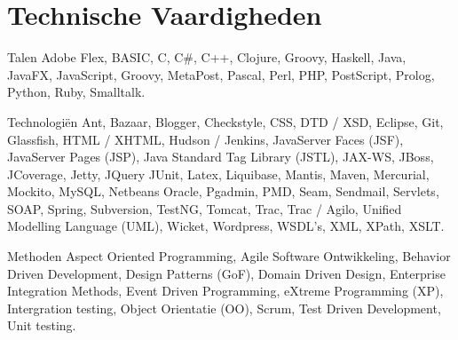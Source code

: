 \section*{Technische Vaardigheden}

	\begin{skillList}
		\item[Talen] Adobe Flex, BASIC, C, C\#, C++, Clojure, Groovy, Haskell, 
		Java, JavaFX, JavaScript, Groovy, MetaPost, Pascal, Perl, PHP, PostScript, 
		Prolog, Python, Ruby, Smalltalk.\hfill\\
		
		\item[Technologi\"en] Ant, Bazaar, Blogger, Checkstyle, CSS, DTD / XSD, 
		Eclipse, Git, Glassfish, HTML / XHTML, Hudson / Jenkins, 
		JavaServer Faces (JSF), JavaServer Pages (JSP), 
		Java Standard Tag Library (JSTL), JAX-WS, JBoss, JCoverage, Jetty, JQuery
		JUnit, Latex, Liquibase, Mantis, Maven, Mercurial, Mockito, MySQL, Netbeans
		Oracle, Pgadmin, PMD, Seam, Sendmail, Servlets, SOAP, Spring, Subversion,
		TestNG, Tomcat, Trac, Trac / Agilo, Unified Modelling Language (UML),
		Wicket, Wordpress, WSDL's, XML, XPath, XSLT.\hfill\\
		
		\item[Methoden] Aspect Oriented Programming, Agile Software Ontwikkeling,
		Behavior Driven Development, Design Patterns (GoF), Domain Driven Design, 
		Enterprise Integration Methods, Event Driven Programming, 
		eXtreme Programming (XP), Intergration testing, Object Orientatie (OO), 
		Scrum, Test Driven Development, Unit testing.\hfill\\
		
	\end{skillList}
